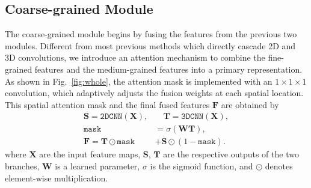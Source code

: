 \documentclass{bmvc2k}
\begin{document}
\vspace{-1em}
\subsection{Coarse-grained Module}
The coarse-grained module begins by fusing the features from the previous two modules. Different from most previous methods which directly cascade 2D and 3D convolutions, we introduce an attention mechanism to combine the fine-grained features and the medium-grained features into a primary representation. As shown in Fig.~\ref{fig:whole}, the attention mask is implemented with an $1\times1\times1$ convolution, which adaptively adjusts the fusion weights at each spatial location. This spatial attention mask and the final fused features $\mathbf{F}$ are obtained by
\begin{equation}
    \begin{aligned}
    \mathbf{S} = \mathtt{2DCNN}(\mathbf{X}), &\quad \mathbf{T} = \mathtt{3DCNN}(\mathbf{X}), \\
    \mathtt{mask} &=\sigma(\mathbf{W}\mathbf{T}),\\
    \mathbf{F} = \mathbf{T} \odot \mathtt{mask} &+ \mathbf{S}\odot (1-\mathtt{mask}).
    \end{aligned}
\end{equation}
where $\mathbf{X}$ are the input feature maps, $\mathbf{S}$, $\mathbf{T}$ are the respective outputs of the two branches, $\mathbf{W}$ is a learned parameter, $\sigma$ is the sigmoid function, and $\odot$ denotes element-wise multiplication.
\end{document}
